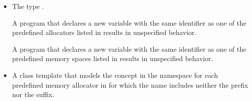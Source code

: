 \begin{ccppspecific}
\begin{itemize}
\item The type .

A program that declares a new variable with the same identifier as one of the predefined allocators listed in  results in unspecified behavior.

A program that declares a new variable with the same identifier as one of the predefined memory spaces listed in  results in unspecified behavior.

\end{itemize}



\end{ccppspecific}


\begin{cppspecific}
\begin{itemize}
 \item A class template that models the  concept in the  namespace for each predefined memory allocator in  for which the name includes neither the  prefix nor the  suffix.
\end{itemize}
\end{cppspecific}


